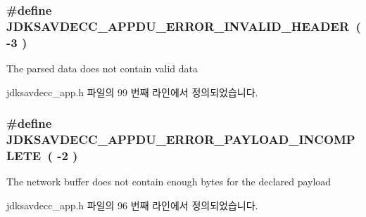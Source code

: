 \subsubsection[{\texorpdfstring{J\+D\+K\+S\+A\+V\+D\+E\+C\+C\+\_\+\+A\+P\+P\+D\+U\+\_\+\+E\+R\+R\+O\+R\+\_\+\+I\+N\+V\+A\+L\+I\+D\+\_\+\+H\+E\+A\+D\+ER}{JDKSAVDECC_APPDU_ERROR_INVALID_HEADER}}]{\setlength{\rightskip}{0pt plus 5cm}\#define J\+D\+K\+S\+A\+V\+D\+E\+C\+C\+\_\+\+A\+P\+P\+D\+U\+\_\+\+E\+R\+R\+O\+R\+\_\+\+I\+N\+V\+A\+L\+I\+D\+\_\+\+H\+E\+A\+D\+ER~( -\/3 )}\hypertarget{group__appdu__errors_gab87365f108c8b06ef41b56adaf53ec2d}{}\label{group__appdu__errors_gab87365f108c8b06ef41b56adaf53ec2d}
The parsed data does not contain valid data 

jdksavdecc\+\_\+app.\+h 파일의 99 번째 라인에서 정의되었습니다.

\subsubsection[{\texorpdfstring{J\+D\+K\+S\+A\+V\+D\+E\+C\+C\+\_\+\+A\+P\+P\+D\+U\+\_\+\+E\+R\+R\+O\+R\+\_\+\+P\+A\+Y\+L\+O\+A\+D\+\_\+\+I\+N\+C\+O\+M\+P\+L\+E\+TE}{JDKSAVDECC_APPDU_ERROR_PAYLOAD_INCOMPLETE}}]{\setlength{\rightskip}{0pt plus 5cm}\#define J\+D\+K\+S\+A\+V\+D\+E\+C\+C\+\_\+\+A\+P\+P\+D\+U\+\_\+\+E\+R\+R\+O\+R\+\_\+\+P\+A\+Y\+L\+O\+A\+D\+\_\+\+I\+N\+C\+O\+M\+P\+L\+E\+TE~( -\/2 )}\hypertarget{group__appdu__errors_gabe3e811ac0be333fe56dd1082062913c}{}\label{group__appdu__errors_gabe3e811ac0be333fe56dd1082062913c}
The network buffer does not contain enough bytes for the declared payload 

jdksavdecc\+\_\+app.\+h 파일의 96 번째 라인에서 정의되었습니다.


